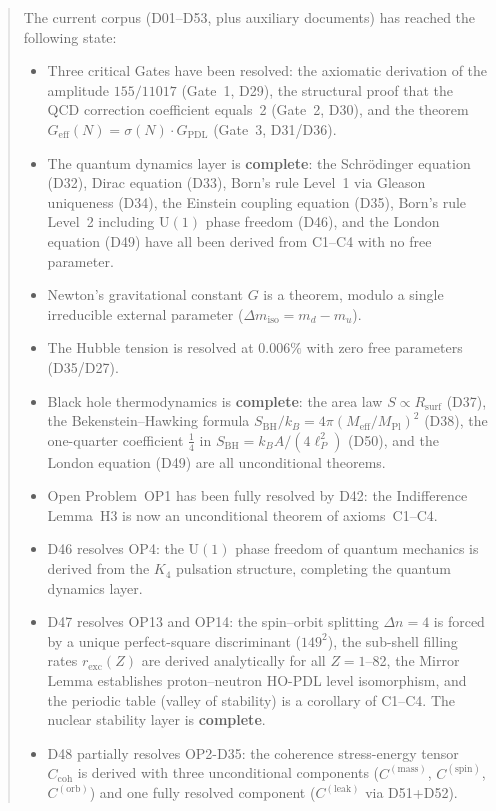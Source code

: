 \documentclass[11pt,a4paper]{article}
\theoremstyle{plain}
\theoremstyle{definition}
\theoremstyle{remark}
\newcommand{\Kfour}{K_4}
\newcommand{\Geff}{G_{\mathrm{eff}}}
\newcommand{\GPDL}{G_{\mathrm{PDL}}}
\newcommand{\Rsurf}{R_{\mathrm{surf}}}
\newcommand{\sigmaN}{\sigma(N)}
\newcommand{\SBH}{S_{\mathrm{BH}}}
\newcommand{\Meff}{M_{\mathrm{eff}}}
\newcommand{\MPl}{M_{\mathrm{Pl}}}
\newcommand{\Ccoh}{C_{\mathrm{coh}}}
\begin{document}
\begin{abstract}
The current corpus (D01--D53, plus auxiliary documents) has reached the following state:
\begin{itemize}
\item Three critical Gates have been resolved: the axiomatic derivation of the amplitude $155/11017$ (Gate~1, D29), the structural proof that the QCD correction coefficient equals~2 (Gate~2, D30), and the theorem $\Geff(N)=\sigmaN\cdot\GPDL$ (Gate~3, D31/D36).
\item The quantum dynamics layer is \textbf{complete}: the Schr\"odinger equation (D32), Dirac equation (D33), Born's rule Level~1 via Gleason uniqueness (D34), the Einstein coupling equation (D35), Born's rule Level~2 including $\mathrm{U}(1)$ phase freedom (D46), and the London equation (D49) have all been derived from C1--C4 with no free parameter.
\item Newton's gravitational constant $G$ is a theorem, modulo a single irreducible external parameter ($\Delta m_{\mathrm{iso}} = m_d - m_u$).
\item The Hubble tension is resolved at $0.006\%$ with zero free parameters (D35/D27).
\item Black hole thermodynamics is \textbf{complete}: the area law $S \propto \Rsurf$ (D37), the Bekenstein--Hawking formula $\SBH/k_B = 4\pi(\Meff/\MPl)^2$ (D38), the one-quarter coefficient $\tfrac{1}{4}$ in $\SBH = k_B A/(4\ell_P^2)$ (D50), and the London equation (D49) are all unconditional theorems.
\item Open Problem~OP1 has been fully resolved by D42: the Indifference Lemma~H3 is now an unconditional theorem of axioms~C1--C4.
\item D46 resolves OP4: the $\mathrm{U}(1)$ phase freedom of quantum mechanics is derived from the $\Kfour$ pulsation structure, completing the quantum dynamics layer.
\item D47 resolves OP13 and OP14: the spin--orbit splitting $\Delta n = 4$ is forced by a unique perfect-square discriminant ($149^2$), the sub-shell filling rates $r_{\mathrm{exc}}(Z)$ are derived analytically for all $Z = 1$--82, the Mirror Lemma establishes proton--neutron HO-PDL level isomorphism, and the periodic table (valley of stability) is a corollary of C1--C4. The nuclear stability layer is \textbf{complete}.
\item D48 partially resolves OP2-D35: the coherence stress-energy tensor $\Ccoh$ is derived with three unconditional components ($C^{(\mathrm{mass})}$, $C^{(\mathrm{spin})}$, $C^{(\mathrm{orb})}$) and one fully resolved component ($C^{(\mathrm{leak})}$ via D51+D52).

\end{itemize}
\end{abstract}
\end{document}
